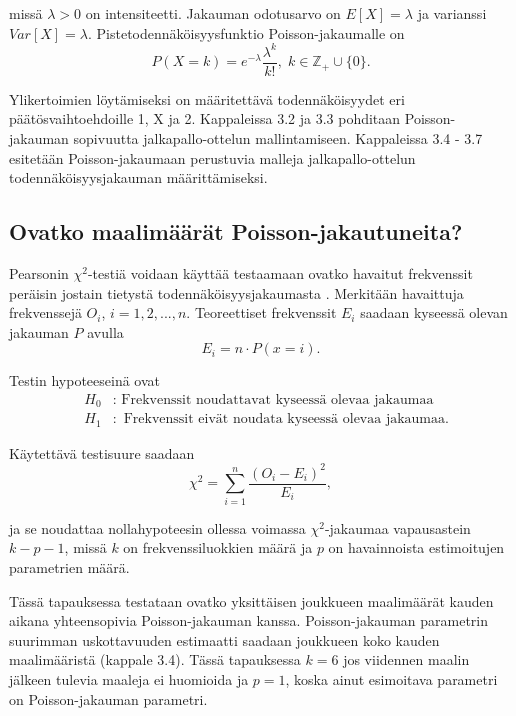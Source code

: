 \documentclass[a4paper,finnish,titlepage,12pt]{article}
\begin{document}
missä $\lambda > 0$ on intensiteetti. Jakauman odotusarvo on $E[X] = \lambda$ ja varianssi $Var[X] = \lambda$. Pistetodennäköisyysfunktio Poisson-jakaumalle on
\begin{equation}
	P(X = k) = e^{-\lambda} \frac{\lambda^k}{k!}, \; k \in \mathbb{Z}_{+} \cup \{0\}.
\end{equation}

Ylikertoimien löytämiseksi on määritettävä todennäköisyydet eri päätösvaihtoehdoille 1, X ja 2. Kappaleissa 3.2 ja 3.3 pohditaan Poisson-jakauman sopivuutta jalkapallo-ottelun mallintamiseen. Kappaleissa 3.4 - 3.7 esitetään Poisson-jakaumaan perustuvia malleja jalkapallo-ottelun todennäköisyysjakauman määrittämiseksi.


\subsection{Ovatko maalimäärät Poisson-jakautuneita?}
Pearsonin $\chi^2$-testiä voidaan käyttää testaamaan ovatko havaitut frekvenssit peräisin jostain tietystä todennäköisyysjakaumasta \cite{mellin}. Merkitään havaittuja frekvenssejä $O_i$, $i=1, 2, ..., n$. Teoreettiset frekvenssit $E_i$ saadaan kyseessä olevan jakauman $P$ avulla
\begin{equation}
	E_i = n \cdot P(x = i).
\end{equation}

Testin hypoteeseinä ovat
\begin{eqnarray*}
	&H_0&: \text{ Frekvenssit noudattavat kyseessä olevaa jakaumaa} \\
	&H_1&: \text{ Frekvenssit eivät noudata kyseessä olevaa jakaumaa}.
\end{eqnarray*}

Käytettävä testisuure saadaan
\begin{equation}
	\chi^2 = \sum_{i=1}^{n} \frac{(O_i - E_i)^2}{E_i},
\end{equation}

ja se noudattaa nollahypoteesin ollessa voimassa $\chi^2$-jakaumaa vapausastein $k - p - 1$, missä $k$ on frekvenssiluokkien määrä ja $p$ on havainnoista estimoitujen parametrien määrä.


Tässä tapauksessa testataan ovatko yksittäisen joukkueen maalimäärät kauden aikana yhteensopivia Poisson-jakauman kanssa. Poisson-jakauman parametrin suurimman uskottavuuden estimaatti saadaan joukkueen koko kauden maalimääristä (kappale 3.4).  Tässä tapauksessa $k = 6$ jos viidennen maalin jälkeen tulevia maaleja ei huomioida ja $p = 1$, koska ainut esimoitava parametri on Poisson-jakauman parametri.
\end{document}
